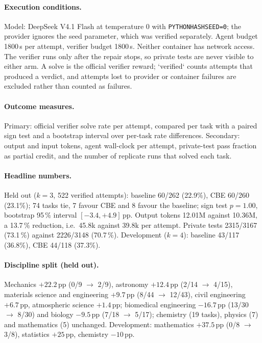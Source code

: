 \paragraph{Execution conditions.}
Model: DeepSeek V4.1 Flash \cite{deepseekusage} at temperature $0$ with \texttt{PYTHONHASHSEED=0};
the provider ignores the seed parameter, which was verified separately. Agent budget 1800\,s per
attempt, verifier budget 1800\,s. Neither container has network access. The verifier runs only
after the repair stops, so private tests are never visible to either arm. A solve is the official
verifier reward; `verified` counts attempts that produced a verdict, and attempts lost to provider
or container failures are excluded rather than counted as failures.

\paragraph{Outcome measures.}
Primary: official verifier solve rate per attempt, compared per task with a paired sign test and a
bootstrap interval over per-task rate differences. Secondary: output and input tokens, agent
wall-clock per attempt, private-test pass fraction as partial credit, and the number of replicate
runs that solved each task.

\paragraph{Headline numbers.}
Held out ($k{=}3$, 522 verified attempts): baseline 60/262 (22.9\%), CBE 60/260 (23.1\%);
74 tasks tie, 7 favour CBE and 8 favour the baseline; sign test $p = 1.00$, bootstrap 95\,\%
interval $[-3.4, +4.9]$\,pp. Output tokens 12.01M against 10.36M, a 13.7\,\% reduction, i.e.\
45.8k against 39.8k per attempt. Private tests 2315/3167 (73.1\,\%) against 2226/3148 (70.7\,\%).
Development ($k{=}4$): baseline 43/117 (36.8\%), CBE 44/118 (37.3\%).

\paragraph{Discipline split (held out).}
Mechanics $+22.2$\,pp (0/9 $\rightarrow$ 2/9), astronomy $+12.4$\,pp (2/14 $\rightarrow$ 4/15),
materials science and engineering $+9.7$\,pp (8/44 $\rightarrow$ 12/43), civil engineering
$+6.7$\,pp, atmospheric science $+1.4$\,pp; biomedical engineering $-16.7$\,pp
(13/30 $\rightarrow$ 8/30) and biology $-9.5$\,pp (7/18 $\rightarrow$ 5/17); chemistry (19 tasks),
physics (7) and mathematics (5) unchanged. Development: mathematics $+37.5$\,pp
(0/8 $\rightarrow$ 3/8), statistics $+25$\,pp, chemistry $-10$\,pp.

